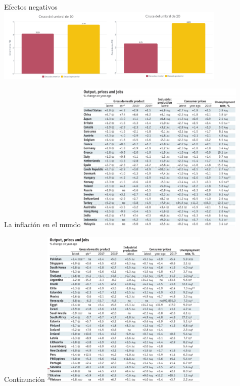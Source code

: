 \documentclass{beamer}
\begin{document}
\begin{frame}{Efectos negativos}
\centering\includegraphics[width=11cm]{Slides Principios de Economia/Figures/38.11.pdf}\
\end{frame}

\begin{frame}{La inflación en el mundo}
    \centering\includegraphics[width=8cm]{Slides Principios de Economia/P70.png}\
\end{frame}


\begin{frame}{Continuación}
    \centering\includegraphics[width=8cm]{Slides Principios de Economia/P71.png}\
\end{frame}
\end{document}
